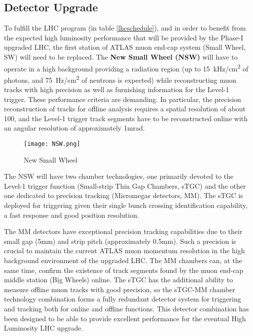 
\subsection{Detector Upgrade}

To fulfill the LHC program (in table \ref{lhcschedule}), and in order to benefit from the expected high luminosity
performance that will be provided by the Phase-I upgraded LHC, the first station of ATLAS muon end-cap system (Small
Wheel, SW) will need to be replaced.  The {\bf New Small Wheel (NSW)} will have to operate in a high background
providing a radiation region (up to \SI{15}{kHz/cm^2} of photons, and \SI{75}{Hz/cm^2} of neutrons is expected) while
reconstructing muon tracks with high precision as well as furnishing information for the Level-1 trigger. These
performance criteria are demanding. In particular, the precision reconstruction of tracks for offline analysis requires
a spatial resolution of about 100, and the Level-1 trigger track segments have to be reconstructed online with
an angular resolution of approximately 1mrad. \par
\begin{figure}[ht]
		\centering
		\texttt{[image: NSW.png]}
		\caption{New Small Wheel}\label{fig:nsw}
\end{figure}

The NSW will have two chamber technologies, one primarily devoted to the Level-1 trigger function (Small-strip Thin Gap
Chambers, sTGC) and the other one dedicated to precision tracking (Micromegas detectors, MM). The sTGC is deployed for
triggering given their single bunch crossing identification capability, a fast response and good position
resolution.\par

The MM detectors have exceptional precision tracking capabilities due to their small gap (\unit{5}{mm}) and strip pitch
(approximately 0.5\si{mm}). Such a precision is crucial to maintain the current ATLAS muon momentum resolution in the
high background environment of the upgraded LHC.  The MM chambers can, at the same time, confirm the existence of track
segments found by the muon end-cap middle station (Big Wheels) online. The sTGC has the additional ability to measure
offline muon tracks with good precision, so the sTGC-MM chamber technology combination forms a fully redundant detector
system for triggering and tracking both for online and offline functions. This detector combination has been designed to
be able to provide excellent performance for the eventual High Luminosity LHC upgrade.\par 



